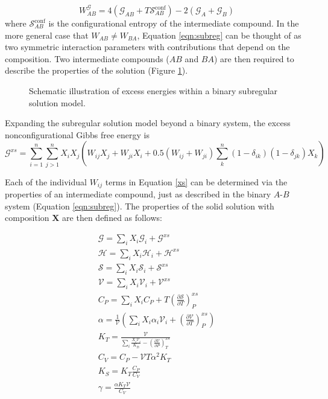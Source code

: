 \begin{equation}
  W^{\mathcal{G}}_{AB} = 4(\mathcal{G}_{AB} + T\mathcal{S}^{\textrm{conf}}_{AB}) - 2(\mathcal{G}_A + \mathcal{G}_B)
\end{equation}
\noindent where $\mathcal{S}^{\textrm{conf}}_{AB}$ is the configurational entropy of the intermediate compound. In the more general case that $W_{AB} \neq W_{BA}$, Equation \ref{eqn:subreg} can be thought of as two symmetric interaction parameters with contributions that depend on the composition. Two intermediate compounds ($AB$ and $BA$) are then required to describe the properties of the solution (Figure \ref{fig:schematic}).

\begin{figure}[ht!]
  \centering
  \caption{Schematic illustration of excess energies within a binary subregular solution model.}
  \label{fig:schematic}
\end{figure}


Expanding the subregular solution model beyond a binary system, the excess nonconfigurational Gibbs free energy is \citep{HW1989} 
\begin{equation}
  \mathcal{G}^{xs} = \sum_{i=1}^n \sum_{j>1}^n X_i X_j \left ( W_{ij} X_j + W_{ji} X_i + 0.5 (W_{ij} + W_{ji}) \sum_k^n (1-\delta_{ik})(1-\delta_{jk}) X_k \right)
  \label{xs}
\end{equation}

Each of the individual $W_{ij}$ terms in Equation \ref{xs} can be determined via the properties of an intermediate compound, just as described in the binary $A$-$B$ system (Equation \ref{eqn:subreg}). The properties of the solid solution with composition $\mathbf{X}$ are then defined as follows:

\begin{eqnarray}
\mathcal{G} = \sum_i X_i \mathcal{G}_i + \mathcal{G}^{xs} \\
\mathcal{H} = \sum_i X_i \mathcal{H}_i + \mathcal{H}^{xs} \\
\mathcal{S} = \sum_i X_i \mathcal{S}_i + \mathcal{S}^{xs} \\
\mathcal{V} = \sum_i X_i \mathcal{V}_i + \mathcal{V}^{xs} \\
C_P = \sum_i X_i C_P  + T \left( \frac{\partial \mathcal{S}}{\partial T} \right)_P^{xs} \\
\alpha = \frac{1}{\mathcal{V}} \left ( \sum_i X_i \alpha_i \mathcal{V}_i + \left( \frac{\partial \mathcal{V}}{\partial T} \right)_P^{xs} \right) \label{alpha} \\
K_T = \frac{\mathcal{V}}{\sum_i \frac{X_i \mathcal{V}_i }{K_{Ti}} - \left( \frac{\partial \mathcal{V}}{\partial P} \right)_T^{xs} } \label{K_T} \\
C_V = C_P - \mathcal{V} T \alpha^2 K_T \\
K_S = K_T \frac{C_P}{C_V} \\
\gamma = \frac{\alpha K_T \mathcal{V}}{C_V}   
\end{eqnarray}

